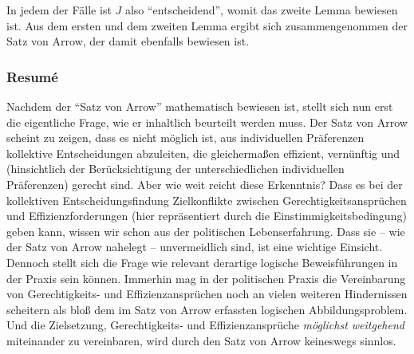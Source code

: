 In jedem der Fälle ist $J$ also "`entscheidend"', womit das zweite Lemma
bewiesen ist. Aus dem ersten und dem zweiten Lemma ergibt sich zusammengenommen
der Satz von Arrow, der damit ebenfalls bewiesen ist.

\subsubsection{Resumé}

Nachdem der "`Satz von Arrow"' mathematisch bewiesen ist, stellt sich nun
erst die eigentliche Frage, wie er inhaltlich beurteilt werden muss. Der Satz
von Arrow scheint zu zeigen, dass es nicht möglich ist, aus individuellen Präferenzen
kollektive Entscheidungen abzuleiten, die gleichermaßen effizient, vernünftig und
(hinsichtlich der Berücksichtigung der unterschiedlichen individuellen
Präferenzen) gerecht sind. Aber wie weit reicht diese Erkenntnis? Dass es bei der
kollektiven Entscheidungsfindung Zielkonflikte zwischen Gerechtigkeitsansprüchen
und Effizienzforderungen (hier repräsentiert durch die Einstimmigkeitsbedingung)
geben kann, wissen wir schon aus der politischen Lebenserfahrung. Dass sie -- wie
der Satz von Arrow nahelegt -- unvermeidlich sind, ist eine wichtige Einsicht.
Dennoch stellt sich die Frage wie relevant derartige logische Beweisführungen in
der Praxis sein können. Immerhin mag in der politischen Praxis die Vereinbarung
von Gerechtigkeits- und Effizienzansprüchen noch an vielen weiteren Hindernissen
scheitern als bloß dem im Satz von Arrow erfassten logischen Abbildungsproblem.
Und die Zielsetzung, Gerechtigkeits- und Effizienzansprüche {\em möglichst
weitgehend} miteinander zu vereinbaren, wird durch den Satz von Arrow keineswegs
sinnlos.

% 

